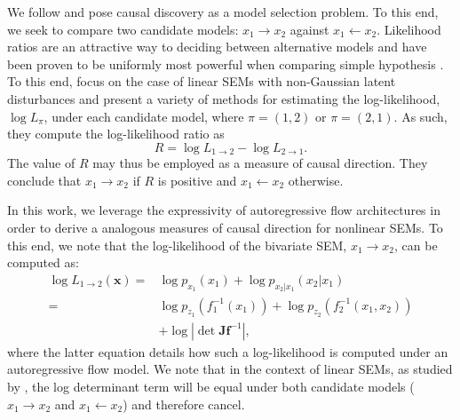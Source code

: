 \documentclass{article}
\begin{document}
We follow \cite{Hyvarinen2013} 
and pose causal discovery as a model selection problem. To this end, we seek to compare
two candidate models: $x_1 \rightarrow x_2$ against $x_1 \leftarrow x_2$. 
Likelihood ratios are an attractive way to deciding between alternative models 
and have been proven to be uniformly most powerful when comparing simple hypothesis \citep{neyman1933ix}.
To this end, \cite{Hyvarinen2013} focus on the case of linear SEMs with non-Gaussian latent disturbances and present a variety of methods for estimating the log-likelihood, $\log L_{\pi}$, under each candidate model, where $\pi = (1,2)$ or $\pi=(2,1)$. As such, they compute the log-likelihood ratio as
\begin{equation}
 R = \log L_{1\rightarrow 2 } - \log L_{2 \rightarrow 1 }.
\end{equation} 
The value of $R$ may thus be employed as a measure of causal direction. 
They conclude that $x_1 \rightarrow x_2$ if $R$ is positive and $x_1 \leftarrow x_2$ otherwise. 

In this work, we leverage the expressivity of autoregressive flow architectures in order to 
derive a analogous measures of causal direction for nonlinear SEMs. 
%
To this end, we note that the 
log-likelihood of the bivariate SEM, $x_1 \rightarrow x_2$, can be computed as:
\begin{align*}
\log L_{1\rightarrow 2 } ( \mathbf{x} ) =& \log p_{x_1}(x_1) + \log p_{x_2|x_1}( x_2 | x_1) \\
=& \log p_{z_1} ( f_1^{-1} (x_1)) + \log p_{z_2} (f_2^{-1}( x_1, x_2)) \\
&+ \log | \det \mathbf{J} \mathbf{f}^{-1}|, 
\end{align*}
where the latter equation 
details how such a
 log-likelihood is computed under an autoregressive flow model. 
 We note that in the context of linear SEMs, as studied by \cite{Hyvarinen2013}, 
 the log determinant term will be equal under both candidate models ($x_1 \rightarrow x_2$ and $x_1 \leftarrow x_2$) and therefore cancel. 
\end{document}
